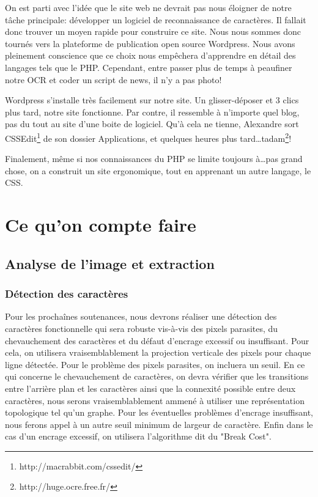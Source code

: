 \documentclass[]{report}
\begin{document}
			On est parti avec l'idée que le site web ne devrait pas nous éloigner de notre tâche principale: développer un logiciel de reconnaissance de caractères. Il fallait donc trouver un moyen rapide pour construire ce site. Nous nous sommes donc tournés vers la plateforme de publication open source Wordpress.
			Nous avons pleinement conscience que ce choix nous empêchera d'apprendre en détail des langages tels que le PHP. Cependant, entre passer plus de temps à peaufiner notre OCR et coder un script de news, il n'y a pas photo!

			Wordpress s'installe très facilement sur notre site. Un glisser-déposer et 3 clics plus tard, notre site fonctionne. Par contre, il ressemble à n'importe quel blog, pas du tout au site d'une boite de logiciel. Qu'à cela ne tienne, Alexandre sort CSSEdit\footnote{http://macrabbit.com/cssedit/} de son dossier Applications, et quelques heures plus tard\ldots tadam\footnote{http://huge.ocre.free.fr/}!

		Finalement, même si nos connaissances du PHP se limite toujours à\ldots pas grand chose, on a construit un site ergonomique, tout en apprenant un autre langage, le CSS.




\part{Ce qu'on compte faire} %
\label{prt:ce_qu_on_compte_faire}

	\chapter{Analyse de l'image et extraction} %
	\label{cha:analyse_de_l'image_et_extraction}

    \section{D\'etection des caractères} %
    \label{sec:d'etection_des_caractères}
      Pour les prochaînes soutenances, nous devrons réaliser une détection des caractères fonctionnelle qui sera robuste vis-à-vis des pixels parasites, du chevauchement des caractères et du défaut d'encrage excessif ou insuffisant. Pour cela, on utilisera vraisemblablement la projection verticale des pixels pour chaque ligne détectée. Pour le problème des pixels parasites, on incluera un seuil. En ce qui concerne le  chevauchement de caractères, on devra vérifier que les transitions entre l'arrière plan et les caractères ainsi que la connexité possible entre deux caractères, nous serons vraisemblablement ammené à utiliser une représentation topologique tel qu'un graphe. Pour les éventuelles problèmes d'encrage insuffisant, nous ferons appel à un autre seuil minimum de largeur de caractère. Enfin dans le cas d'un encrage excessif, on utilisera l'algorithme dit du "Break Cost".
\end{document}
